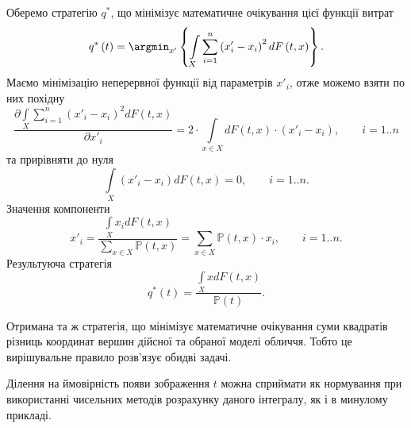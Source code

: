 Оберемо стратегію $q^*$,
що мінімізує математичне очікування цієї функції витрат
\begin{equation*}
  q^* \left( t \right)
  = \argmin_{x'} \left\{
    \int\limits_{X}
        \sum_{i = 1}^n \left( x'_i - x_i \right)^2
        dF\left( t, x \right)
    \right\}.
\end{equation*}
Маємо мінімізацію неперервної функції від параметрів $x'_i$,
отже можемо взяти по них похідну
\begin{equation*}
  \frac{\partial \int\limits_{X}
      \sum\limits_{i = 1}^n \left( x'_i - x_i \right)^2
      dF\left( t, x \right)
  }{\partial x'_i}
  = 2 \cdot \int\limits_{x \in X} dF\left( t, x \right)
    \cdot \left( x'_i - x_i \right), \qquad i = 1..n
\end{equation*}
та прирівняти до нуля
\begin{equation*}
  \int\limits_{X}
    \left( x'_i - x_i \right) dF\left( t, x \right) = 0, \qquad i = 1..n.
\end{equation*}
Значення компоненти
\begin{equation*}
  x'_i = \frac{\int\limits_{X} x_i dF\left( t, x \right)}
    {\sum\limits_{x \in X}
      \mathbb{P} \left( t, x \right)}
  = \sum\limits_{x \in X}
    \mathbb{P} \left( t, x \right) \cdot x_i, \qquad i = 1..n.
\end{equation*}
Результуюча стратегія
\begin{equation*}
  q^*\left( t \right)
  = \frac{\int\limits_{X} x dF\left( t, x \right)}{\mathbb{P}\left( t \right)}.
\end{equation*}

Отримана та ж стратегія,
що мінімізує математичне очікування суми квадратів різниць
координат вершин дійсної та обраної моделі обличчя.
Тобто це вирішувальне правило розв'язує обидві задачі.

Ділення на ймовірність появи зображення $t$ можна сприймати як нормування
при використанні чисельних методів розрахунку даного інтегралу,
як і в минулому прикладі.
